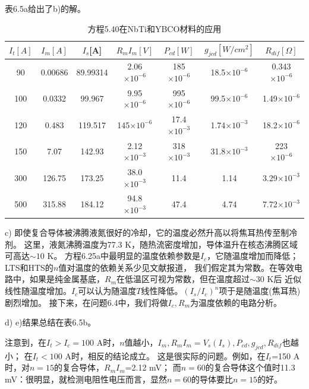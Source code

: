 表6.5a给出了b)的解。


\begin{table}[htbp]\small
\centering
\caption{方程5.40在NbTi和YBCO材料的应用} 
\begin{tabular}{|c|c|c|c|c|c|c|}
\hline
 $I_t[A]$   &$I_m[A]$         &$I_s$[A]          &$R_mI_m[V]$
 &$P_{cd}[W]$      &  $g_{jcd}[W/cm^2]$    & $R_{dif}[\Omega]$      \\
 \hline
90  & 0.00686 & 89.99314 & 2.06$\times10^{-6}$ & 185$\times10^{-6}$  & 18.5$\times10^{-6}$ & 0.343$\times10^{-6}$ \\ \hline
100 & 0.0332  & 99.967   & 9.95$\times10^{-6}$ & 995$\times10^{-6}$  & 99.5$\times10^{-6}$ & 1.49$\times10^{-6}$  \\ \hline
120 & 0.483   & 119.517  & 145$\times10^{-6}$  & 17.4$\times10^{-3}$ & 1.74$\times10^{-3}$ & 18.2$\times10^{-6}$  \\ \hline
150 & 7.07    & 142.93   & 2.12$\times10^{-3}$ & 318$\times10^{-3}$  & 31.8$\times10^{-3}$ & 223 $\times10^{-6}$  \\ \hline
300 & 126.75  & 173.25   & 38.0$\times10^{-3}$ & 11.4 & 1.14 & 3.29$\times10^{-3}$  \\ \hline
500 & 315.88  & 184.12   & 94.8$\times10^{-3}$ & 47.4 & 4.74 & 7.72$\times10^{-3}$  \\ \hline
\end{tabular}
\end{table}


c) 即使复合导体被沸腾液氮很好的冷却，它的温度必然升高以将焦耳热传至制冷剂。
这里，液氮沸腾温度为77.3 K，随热流密度增加，导体温升在核态沸腾区域可高达$\sim 10$ K。
方程6.25a中最明显的温度依赖参数是$I_c$，它随温度增加而降低；LTS和HTS的$n$值对温度的依赖关系少见文献报道，
我们假定其为常数。在等效电路中，如果是纯金属基底，$R_m$在低温区可视为常数，但在温度超过$\sim 30$ K后
近似线性随温度增加。$I_c$可以认为随温度$T$线性降低。$(I_s/I_c)^n$项于是随温度(焦耳热)剧烈增加。
接下来，在问题6.4中，我们将做$I_c,R_m$为温度依赖的电路分析。

d) e)结果总结在表6.5b。

注意到，在$I_t>I_c=100$ A时，$n$值越小，$I_m, R_m I_m=V_s(I_s),P_{cd},g_{jcd},R_{dif}$也越小；
在$I_t<100$ A时，相反的结论成立。
这是很实际的问题。例如，在$I_t$=150 A时，对$n=15$的复合导体，$R_mI_m$=2.12 mV；
而$n=60$的复合导体这个值时11.3 mV：很明显，就检测电阻性电压而言，显然$n=60$的导体要比$n=15$的好。 

